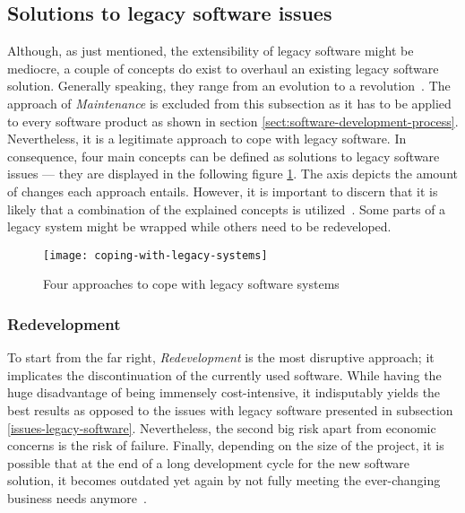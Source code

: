 \documentclass[12pt,a4paper,twoside]{report}
\begin{document}
\subsection{Solutions to legacy software issues} \label{solutions-issues-legacy-software}

Although, as just mentioned, the extensibility of legacy software might be mediocre,
a couple of concepts do exist to overhaul an existing legacy software solution.
Generally speaking, they range from an evolution to a revolution~\cite{bisbal-legacy-issues}.
The approach of \textit{Maintenance} is excluded from this subsection as it
has to be applied to every software product as shown in section \ref{sect:software-development-process}.
Nevertheless, it is a legitimate approach to cope with legacy software.
In consequence, four main concepts can be defined as solutions to legacy software issues ---
they are displayed in the following figure \ref{fig:coping-legacy}.
The axis depicts the amount of changes each approach entails.
However, it is important to discern that it is likely that a combination of
the explained concepts is utilized~\cite{bisbal-legacy-issues}.
Some parts of a legacy system might be wrapped while others need to be redeveloped.

\begin{figure}[htbp]
\centering
\texttt{[image: coping-with-legacy-systems]}
\caption{Four approaches to cope with legacy software systems~\cite{bisbal-legacy-issues}}
\label{fig:coping-legacy}
\end{figure}


\subsubsection{Redevelopment}

To start from the far right, \textit{Redevelopment} is the most disruptive approach;
it implicates the discontinuation of the currently used software.
While having the huge disadvantage of being immensely cost-intensive, it indisputably
yields the best results as opposed to the issues with legacy software presented in
subsection \ref{issues-legacy-software}.
Nevertheless, the second big risk apart from economic concerns is
the risk of failure.
Finally, depending on the size of the project, it is possible that at the end
of a long development cycle for the new software solution, it becomes outdated
yet again by not fully meeting the ever-changing
business needs anymore~\cite{stevens-software-reengineering-patterns}.
\end{document}
